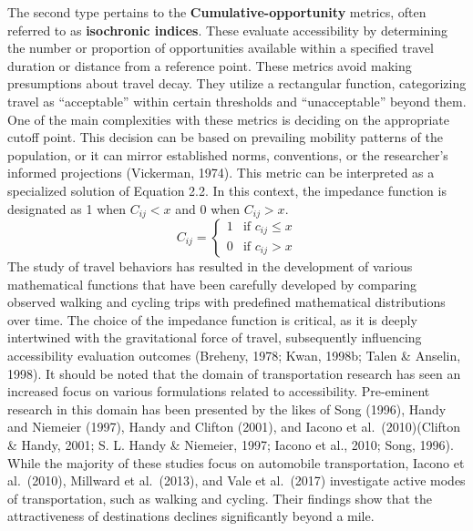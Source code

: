 \documentclass[12pt,twoside]{reedthesis}
\begin{document}
The second type pertains to the \textbf{Cumulative-opportunity} metrics, often referred to as \textbf{isochronic indices}. These evaluate accessibility by determining the number or proportion of opportunities available within a specified travel duration or distance from a reference point. These metrics avoid making presumptions about travel decay. They utilize a rectangular function, categorizing travel as ``acceptable'' within certain thresholds and ``unacceptable'' beyond them. One of the main complexities with these metrics is deciding on the appropriate cutoff point. This decision can be based on prevailing mobility patterns of the population, or it can mirror established norms, conventions, or the researcher's informed projections (Vickerman, 1974). This metric can be interpreted as a specialized solution of Equation 2.2. In this context, the impedance function is designated as 1 when \(C_{ij}< x\) and 0 when \(C_{ij} > x\).
\begin{equation}
C_{ij} =
\begin{cases}
  1 & \text{if } c_{ij} \le x \\
  0 & \text{if } c_{ij} > x
\end{cases}
\label{eq:Rectangular form of impedance function}
\end{equation}
The study of travel behaviors has resulted in the development of various mathematical functions that have been carefully developed by comparing observed walking and cycling trips with predefined mathematical distributions over time. The choice of the impedance function is critical, as it is deeply intertwined with the gravitational force of travel, subsequently influencing accessibility evaluation outcomes (Breheny, 1978; Kwan, 1998b; Talen \& Anselin, 1998). It should be noted that the domain of transportation research has seen an increased focus on various formulations related to accessibility. Pre-eminent research in this domain has been presented by the likes of Song (1996), Handy and Niemeier (1997), Handy and Clifton (2001), and Iacono et al.~(2010)(Clifton \& Handy, 2001; S. L. Handy \& Niemeier, 1997; Iacono et al., 2010; Song, 1996). While the majority of these studies focus on automobile transportation, Iacono et al.~(2010), Millward et al.~(2013), and Vale et al.~(2017) investigate active modes of transportation, such as walking and cycling. Their findings show that the attractiveness of destinations declines significantly beyond a mile.
\end{document}
